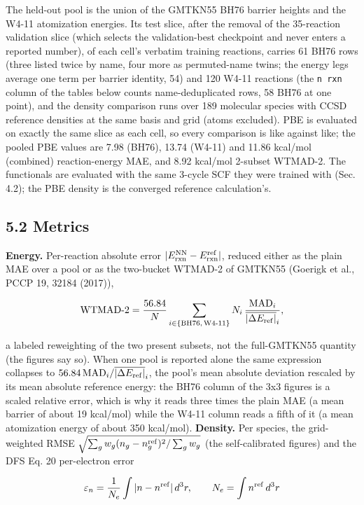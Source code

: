 \documentclass[10pt,a4paper]{article}
\begin{document}
The held-out pool is the union of the GMTKN55 BH76 barrier heights and the W4-11 atomization energies. Its test slice, after the removal of the 35-reaction validation slice (which selects the validation-best checkpoint and never enters a reported number), of each cell's verbatim training reactions, carries 61 BH76 rows (three listed twice by name, four more as permuted-name twins; the energy legs average one term per barrier identity, 54) and 120 W4-11 reactions (the \texttt{n rxn} column of the tables below counts name-deduplicated rows, 58 BH76 at one point), and the density comparison runs over 189 molecular species with CCSD reference densities at the same basis and grid (atoms excluded). PBE is evaluated on exactly the same slice as each cell, so every comparison is like against like; the pooled PBE values are 7.98 (BH76), 13.74 (W4-11) and 11.86 kcal/mol (combined) reaction-energy MAE, and 8.92 kcal/mol 2-subset WTMAD-2. The functionals are evaluated with the same 3-cycle SCF they were trained with (Sec. 4.2); the PBE density is the converged reference calculation's.

\subsection*{5.2 Metrics}

\textbf{Energy.} Per-reaction absolute error $|E^{\rm NN}_{\rm rxn} - E^{\rm ref}_{\rm rxn}|$, reduced either as the plain MAE over a pool or as the two-bucket WTMAD-2 of GMTKN55 (Goerigk et al., PCCP 19, 32184 (2017)),

\[
\mathrm{WTMAD\text{-}2} = \frac{56.84}{N}\sum_{i\in\{\rm BH76,\,W4\text{-}11\}} N_i\,\frac{\mathrm{MAD}_i}{\overline{|\Delta E_{\rm ref}|}_i},
\]

a labeled reweighting of the two present subsets, not the full-GMTKN55 quantity (the figures say so). When one pool is reported alone the same expression collapses to $56.84\, \mathrm{MAD}_i / \overline{|\Delta E_{\rm ref}|}_i$, the pool's mean absolute deviation rescaled by its mean absolute reference energy: the BH76 column of the 3x3 figures is a scaled relative error, which is why it reads three times the plain MAE (a mean barrier of about 19 kcal/mol) while the W4-11 column reads a fifth of it (a mean atomization energy of about 350 kcal/mol). \textbf{Density.} Per species, the grid-weighted RMSE $\sqrt{\sum_g w_g (n_g - n_g^{\rm ref})^2 / \sum_g w_g}$ (the self-calibrated figures) and the DFS Eq. 20 per-electron error

\[
\varepsilon_n = \frac{1}{N_e}\int |n - n^{\rm ref}|\, d^3r, \qquad N_e = \int n^{\rm ref}\, d^3r
\]
\end{document}
